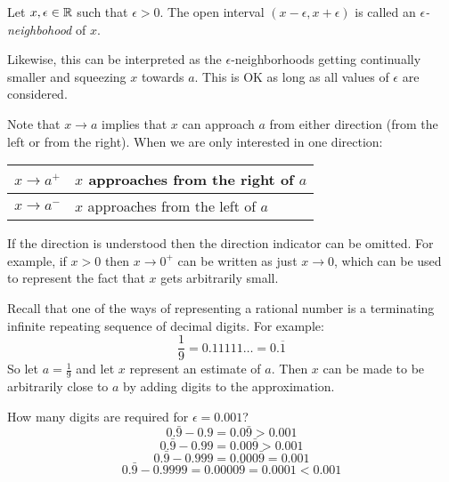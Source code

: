 \documentclass[letterpaper,12pt,fleqn]{article}
\newcommand{\e}{\epsilon}
\begin{document}
\begin{definition}[Neighborhood]
  Let \(x,\e\in\R\) such that \(\e>0\).  The open interval \((x-\e,x+\e)\) is called an \emph{\(\e\)-neighbohood}
  of \(x\).
\end{definition}

Likewise, this can be interpreted as the \(\e\)-neighborhoods getting continually smaller and squeezing \(x\)
towards \(a\).  This is OK as long as all values of \(\e\) are considered.

\begin{notation}
Note that \(x\to a\) implies that \(x\) can approach \(a\) from either direction (from the left or from the right).
When we are only interested in one direction:

\bigskip

\begin{center}
  \begin{tabular}{|c|l|}
    \hline
    \(x\to a^+\) & \(x\) approaches from the right of \(a\) \\
    \hline
    \(x\to a^-\) & \(x\) approaches from the left of \(a\) \\
    \hline
  \end{tabular}
\end{center}

\bigskip

If the direction is understood then the direction indicator can be omitted.  For example, if \(x>0\) then
\(x\to0^+\) can be written as just \(x\to0\), which can be used to represent the fact that \(x\) gets arbitrarily
small.
\end{notation}

\begin{example}
  Recall that one of the ways of representing a rational number is a terminating infinite repeating sequence of
  decimal digits.  For example:
  \[\frac{1}{9}=0.11111\ldots=0.\overline{1}\]
  So let \(a=\frac{1}{9}\) and let \(x\) represent an estimate of \(a\).  Then \(x\) can be made to be arbitrarily
  close to \(a\) by adding digits to the approximation.

  \bigskip

  \begin{center}
  \end{center}

  How many digits are required for \(\e=0.001\)?
  \[0.\bar{9}-0.9=0.0\bar{9}>0.001\]
  \[0.\bar{9}-0.99=0.00\bar{9}>0.001\]
  \[0.\bar{9}-0.999=0.000\bar{9}=0.001\]
  \[0.\bar{9}-0.9999=0.0000\bar{9}=0.0001<0.001\]
\end{example}
\end{document}
